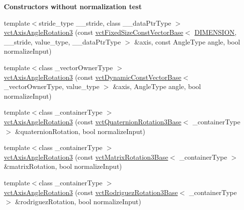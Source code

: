 \begin{Indent}{\bf Constructors without normalization test}
{\begin{DoxyItemize}
\end{DoxyItemize}}\begin{DoxyCompactItemize}
\item 
{\footnotesize template$<$stride\-\_\-type \-\_\-\-\_\-stride, class \-\_\-\-\_\-data\-Ptr\-Type $>$ }\\\hyperlink{classvct_axis_angle_rotation3_a0f6f1bc1932974648c434795c928da93}{vct\-Axis\-Angle\-Rotation3} (const \hyperlink{classvct_fixed_size_const_vector_base}{vct\-Fixed\-Size\-Const\-Vector\-Base}$<$ \hyperlink{classvct_axis_angle_rotation3_a278b4a98a62e4f5ff42ce055836240a9a778d22dfe29402d2cfdd381c1b870285}{D\-I\-M\-E\-N\-S\-I\-O\-N}, \-\_\-\-\_\-stride, value\-\_\-type, \-\_\-\-\_\-data\-Ptr\-Type $>$ \&axis, const Angle\-Type angle, bool normalize\-Input)
\item 
{\footnotesize template$<$class \-\_\-vector\-Owner\-Type $>$ }\\\hyperlink{classvct_axis_angle_rotation3_ac956d88cd5738814d0a7cc371f2c6a6e}{vct\-Axis\-Angle\-Rotation3} (const \hyperlink{classvct_dynamic_const_vector_base}{vct\-Dynamic\-Const\-Vector\-Base}$<$ \-\_\-vector\-Owner\-Type, value\-\_\-type $>$ \&axis, Angle\-Type angle, bool normalize\-Input)
\item 
{\footnotesize template$<$class \-\_\-container\-Type $>$ }\\\hyperlink{classvct_axis_angle_rotation3_a480f58d5670bfa86156cbc480315289c}{vct\-Axis\-Angle\-Rotation3} (const \hyperlink{classvct_quaternion_rotation3_base}{vct\-Quaternion\-Rotation3\-Base}$<$ \-\_\-container\-Type $>$ \&quaternion\-Rotation, bool normalize\-Input)
\item 
{\footnotesize template$<$class \-\_\-container\-Type $>$ }\\\hyperlink{classvct_axis_angle_rotation3_a95f2a93ec7159be4e2745dc4c1e69d64}{vct\-Axis\-Angle\-Rotation3} (const \hyperlink{classvct_matrix_rotation3_base}{vct\-Matrix\-Rotation3\-Base}$<$ \-\_\-container\-Type $>$ \&matrix\-Rotation, bool normalize\-Input)
\item 
{\footnotesize template$<$class \-\_\-container\-Type $>$ }\\\hyperlink{classvct_axis_angle_rotation3_a13fc3b115bce109caaf269ab41da1dcc}{vct\-Axis\-Angle\-Rotation3} (const \hyperlink{classvct_rodriguez_rotation3_base}{vct\-Rodriguez\-Rotation3\-Base}$<$ \-\_\-container\-Type $>$ \&rodriguez\-Rotation, bool normalize\-Input)
\end{DoxyCompactItemize}
\end{Indent}

